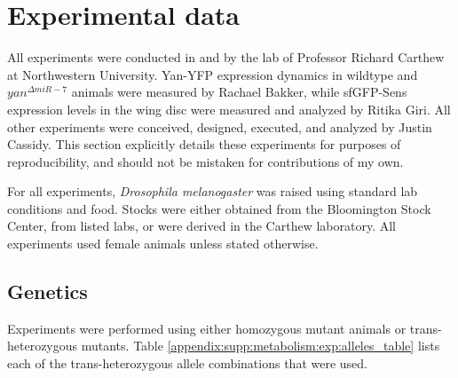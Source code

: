\graphicspath{ {./figures/metabolism/} }


\section{Experimental data}
\label{appendix:supp:metabolism:experiments}

All experiments were conducted in and by the lab of Professor Richard Carthew at Northwestern University. Yan-YFP expression dynamics in wildtype and $yan^{\Delta miR-7}$ animals were measured by Rachael Bakker, while sfGFP-Sens expression levels in the wing disc were measured and analyzed by Ritika Giri. All other experiments were conceived, designed, executed, and analyzed by Justin Cassidy. This section explicitly details these experiments for purposes of reproducibility, and should not be mistaken for contributions of my own.

For all experiments, \textit{Drosophila melanogaster} was raised using standard lab conditions and food. Stocks were either obtained from the Bloomington Stock Center, from listed labs, or were derived in the Carthew laboratory. All experiments used female animals unless stated otherwise.

\subsection{Genetics}
\label{appendix:supp:metabolism:exp:genetics}

Experiments were performed using either homozygous mutant animals or trans-heterozygous mutants. Table \ref{appendix:supp:metabolism:exp:alleles_table} lists each of the trans-heterozygous allele combinations that were used.

